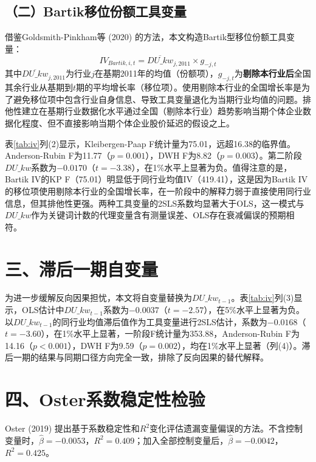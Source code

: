 \documentclass[11pt,a4paper]{article}
\begin{document}
\subsection*{（二）Bartik移位份额工具变量}

借鉴Goldsmith-Pinkham等 (2020) 的方法，本文构造Bartik型移位份额工具变量：
\begin{equation}
IV_{Bartik,i,t} = \overline{DU\_kw}_{j,2011} \times g_{-j,t}
\end{equation}
其中$\overline{DU\_kw}_{j,2011}$为行业$j$在基期2011年的均值（份额项），$g_{-j,t}$为\textbf{剔除本行业后}全国其余行业从基期到$t$期的平均增长率（移位项）。使用剔除本行业的全国增长率是为了避免移位项中包含行业自身信息、导致工具变量退化为当期行业均值的问题。排他性建立在基期行业数据化水平通过全国（剔除本行业）趋势影响当期个体企业数据化程度、但不直接影响当期个体企业股价延迟的假设之上。

表\ref{tab:iv}列(2)显示，Kleibergen-Paap F统计量为75.01，远超16.38的临界值。Anderson-Rubin F为11.77（$p=0.001$），DWH F为8.82（$p=0.003$）。第二阶段$DU\_kw$系数为$-0.0170$（$t=-3.38$），在1\%水平上显著为负。值得注意的是，Bartik IV的KP F（75.01）明显低于同行业均值IV（419.41），这是因为Bartik IV的移位项使用剔除本行业的全国增长率，在一阶段中的解释力弱于直接使用同行业信息，但其排他性更强。两种工具变量的2SLS系数均显著大于OLS，这一模式与$DU\_kw$作为关键词计数的代理变量含有测量误差、OLS存在衰减偏误的预期相符。

\section*{三、滞后一期自变量}

为进一步缓解反向因果担忧，本文将自变量替换为$DU\_kw_{t-1}$。表\ref{tab:iv}列(3)显示，OLS估计中$DU\_kw_{t-1}$系数为$-0.0037$（$t=-2.57$），在5\%水平上显著为负。以$DU\_kw_{t-1}$的同行业均值滞后值作为工具变量进行2SLS估计，系数为$-0.0168$（$t=-3.60$），在1\%水平上显著，一阶段F统计量为353.88，Anderson-Rubin F为14.16（$p<0.001$），DWH F为9.59（$p=0.002$），均在1\%水平上显著（列(4)）。滞后一期的结果与同期口径方向完全一致，排除了反向因果的替代解释。

\section*{四、Oster系数稳定性检验}

Oster (2019) 提出基于系数稳定性和$R^2$变化评估遗漏变量偏误的方法。不含控制变量时，$\hat{\beta}=-0.0053$，$R^2=0.409$；加入全部控制变量后，$\hat{\beta}=-0.0042$，$R^2=0.425$。
\end{document}
